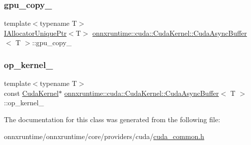 \subsubsection{\texorpdfstring{gpu\+\_\+copy\+\_\+}{gpu\_copy\_}}
{\footnotesize\ttfamily template$<$typename T$>$ \\
\mbox{\hyperlink{namespaceonnxruntime_a323aace024f171700e4b07b299a178e7}{I\+Allocator\+Unique\+Ptr}}$<$T$>$ \mbox{\hyperlink{classonnxruntime_1_1cuda_1_1CudaKernel_1_1CudaAsyncBuffer}{onnxruntime\+::cuda\+::\+Cuda\+Kernel\+::\+Cuda\+Async\+Buffer}}$<$ T $>$\+::gpu\+\_\+copy\+\_\+\hspace{0.3cm}{\ttfamily [protected]}}

\mbox{\label{classonnxruntime_1_1cuda_1_1CudaKernel_1_1CudaAsyncBuffer_af1dd8b6408d512cc9ec0c5173647acad}} 
\subsubsection{\texorpdfstring{op\+\_\+kernel\+\_\+}{op\_kernel\_}}
{\footnotesize\ttfamily template$<$typename T$>$ \\
const \mbox{\hyperlink{classonnxruntime_1_1cuda_1_1CudaKernel}{Cuda\+Kernel}}$\ast$ \mbox{\hyperlink{classonnxruntime_1_1cuda_1_1CudaKernel_1_1CudaAsyncBuffer}{onnxruntime\+::cuda\+::\+Cuda\+Kernel\+::\+Cuda\+Async\+Buffer}}$<$ T $>$\+::op\+\_\+kernel\+\_\+\hspace{0.3cm}{\ttfamily [protected]}}



The documentation for this class was generated from the following file\+:\begin{DoxyCompactItemize}
\item 
onnxruntime/onnxruntime/core/providers/cuda/\mbox{\hyperlink{cuda__common_8h}{cuda\+\_\+common.\+h}}\end{DoxyCompactItemize}
